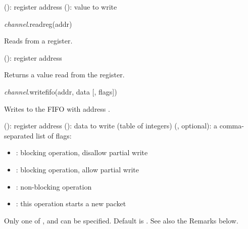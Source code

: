 \documentclass[a4paper,12pt,twoside,extrafontsizes]{memoir}
\begin{document}
\begin{funcparams}
	 (): register address
	 (): value to write
\end{funcparams}


\begin{luafuncprototype}
\emph{channel}.readreg(addr)
\end{luafuncprototype}

\begin{funcdescr}
	Reads from a register.
\end{funcdescr}

\begin{funcparams}
	 (): register address
\end{funcparams}

\begin{funcret}
	Returns a value read from the register.
\end{funcret}


\begin{luafuncprototype}
\emph{channel}.writefifo(addr, data [, flags])
\end{luafuncprototype}

\begin{funcdescr}
	Writes  to the FIFO with address .
\end{funcdescr}

\begin{funcparams}
	 (): register address
	 (): data to write (table of integers)
	 (, optional): a comma-separated list of flags:
		\begin{itemize}
			\item {}: blocking operation, disallow partial write
			\item {}: blocking operation, allow partial write
			\item {}: non-blocking operation
			\item {}: this operation starts a new packet
		\end{itemize}
	
	Only one of ,  and  can be specified. Default is . See also the Remarks below.
\end{funcparams}
\end{document}
